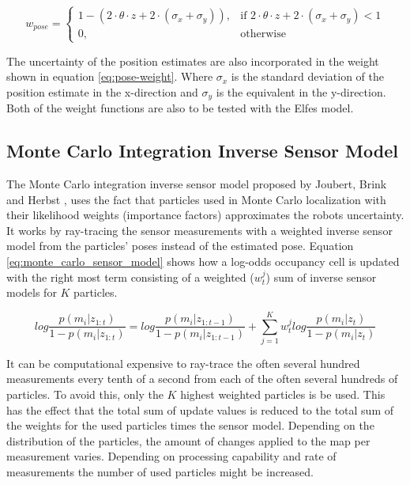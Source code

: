 \begin{equation}
\label{eq:pose-weight}
w_{pose} = 
\begin{cases}
1 - ( 2 \cdot \theta \cdot z + 2 \cdot (\sigma_x + \sigma_y) ), & \text{if } 2 \cdot \theta \cdot z + 2 \cdot (\sigma_x + \sigma_y) < 1\\
0, & \text{otherwise}
\end{cases}
\end{equation}

The uncertainty of the position estimates are also incorporated in the weight shown in equation \vref{eq:pose-weight}.
Where \(\sigma_x\) is the standard deviation of the position estimate in the x-direction and \(\sigma_y\) is the equivalent in the y-direction.
Both of the weight functions are also to be tested with the Elfes model.

\subsection{Monte Carlo Integration Inverse Sensor Model}
\label{sec:monte_carlo_sensor Model}
The Monte Carlo integration inverse sensor model proposed by Joubert, Brink and Herbst \cite{Joubert2014},  uses the fact that particles used in Monte Carlo localization with their likelihood weights (importance factors) approximates the robots uncertainty. 
It works by ray-tracing the sensor measurements with a weighted inverse sensor model from the particles' poses instead of the estimated pose. 
Equation \vref{eq:monte_carlo_sensor_model} shows how a log-odds occupancy cell is updated with the right most term consisting of a weighted ($w_t^j$) sum of inverse sensor models for $K$ particles.

\begin{equation}
log \frac{p(m_i|z_{1:t})}{1-p(m_i|z_{1:t})} = log \frac{p(m_i|z_{1:t-1})}{1-p(m_i|z_{1:t-1})} + \sum_{j=1}^{K} w_t^j log \frac{ p(m_i | z_t) }{ 1 - p(m_i | z_t) }
\label{eq:monte_carlo_sensor_model}
\end{equation}

It can be computational expensive to ray-trace the often several hundred measurements every tenth of a second from each of the often several hundreds of particles.
To avoid this, only the $K$ highest weighted particles is be used. 
This has the effect that the total sum of update values is reduced to the total sum of the weights for the used particles times the sensor model.
Depending on the distribution of the particles, the amount of changes applied to the map per measurement varies.
Depending on processing capability and rate of measurements the number of used particles might be increased.

